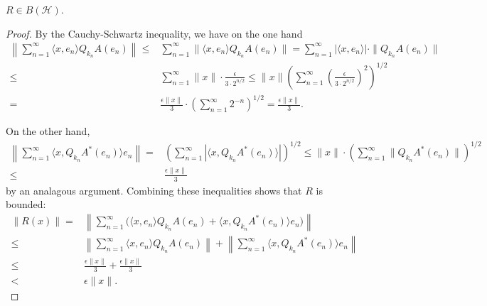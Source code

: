 \documentclass[12pt]{article}
\begin{document}
\begin{proposition}
\label{prop_r_bh}
	$R\in B(\mathcal{H})$.
\end{proposition}
\begin{proof}
	By the Cauchy-Schwartz inequality, we have on the one hand
	\begin{align*}
		\left\| \sum_{n=1}^\infty \langle x, e_n \rangle Q_{k_n}A(e_n) \right\| \leq&
		\sum_{n=1}^\infty \| \langle x, e_n \rangle Q_{k_n}A(e_n) \| 
		= \sum_{n=1}^\infty | \langle x, e_n \rangle | \cdot \|Q_{k_n}A(e_n)\| \\
		\leq& \sum_{n=1}^\infty \|x\| \cdot \frac{\epsilon}{3\cdot 2^{n/2}} 
		\leq \|x\| \left( \sum_{n=1}^\infty \left( \frac{\epsilon}{3\cdot 2^{n/2}} \right)^2 \right)^{1/2} \\
		=& \frac{\epsilon \|x\|}{3} \cdot \left( \sum_{n=1}^\infty 2^{-n} \right)^{1/2} 
		= \frac{\epsilon \|x\|}{3}.
	\end{align*}

	On the other hand,
	\begin{align*}
		\left\| \sum_{n=1}^\infty \langle x, Q_{k_n}A^\ast(e_n) \rangle e_n \right\| 
		=& \left( \sum_{n=1}^\infty |\langle x, Q_{k_n}A^\ast(e_n) \rangle | \right)^{1/2} 
		\leq \|x\| \cdot \left( \sum_{n=1}^\infty \| Q_{k_n}A^\ast(e_n) \| \right)^{1/2} \\
		\leq& \frac{\epsilon \|x\|}{3}
	\end{align*}
	by an analagous argument. Combining these inequalities shows that $R$ is bounded:
	\begin{align*}
		\|R(x)\|  
		=& \left\| \sum_{n=1}^\infty \Big( \langle x, e_n \rangle Q_{k_n}A(e_n) + \langle x, Q_{k_n}A^\ast(e_n) \rangle e_n \Big) \right\| \\
		\leq& \left\| \sum_{n=1}^\infty \langle x, e_n \rangle Q_{k_n}A(e_n) \right\| + 	\left\| \sum_{n=1}^\infty \langle x, Q_{k_n}A^\ast(e_n) \rangle e_n \right\| \\
		\leq& \frac{\epsilon \|x\|}{3} + \frac{\epsilon \|x\|}{3} \\
		<& \epsilon \|x\|.
	\end{align*}
\end{proof}
\end{document}
